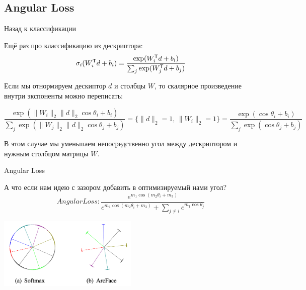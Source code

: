 \subsection{Angular Loss}

\begin{frame}{Назад к классификации}

Ещё раз про классификацию из дескриптора:
\[
\sigma_i(W^{\mathsf{\scriptstyle T}}_i d + b_i) = \frac{\exp ( W^{\mathsf{\scriptstyle T}}_i d + b_i )}{\sum_j \exp ( W^{\mathsf{\scriptstyle T}}_j d + b_j )}
\]

Если мы отнормируем дескиптор $d$ и столбцы $W$, то скалярное произведение внутри экспоненты можно переписать:

\[
\frac{\exp ( \|W_i\|_2 \|d\|_2 \cos \theta_{i} + b_i )}{\sum_j \exp ( \|W_j\|_2 \|d\|_2 \cos \theta_{j} + b_j )} = \{ \|d\|_2 = 1,\, \|W_i\|_2 = 1 \} = 
\frac{\exp ( \cos \theta_{i} + b_i )}{\sum_j \exp ( \cos \theta_{j} + b_j )}
\]

В этом случае мы уменьшаем непосредственно угол между дескриптором и нужным столбцом матрицы $W$.
    
\end{frame}

\begin{frame}{Angular Loss}

А что если нам идею с зазором добавить в оптимизируемый нами угол?
\[
AngularLoss : \frac{e^{ m_1 \cos (m_2 \theta_{i} + m_3)} }{e^{ m_1 \cos (m_2 \theta_{i} + m_3) } + \sum_{j \neq i} e^{ m_1 \cos \theta_{j}} }
\]

\centering
\includegraphics[width=0.5\textwidth]{images/arcface.png}
    
\end{frame}

